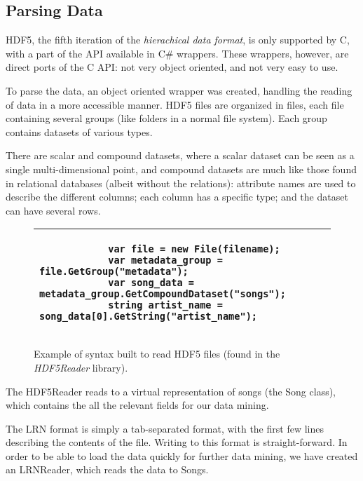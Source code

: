 \subsection{Parsing Data}
\label{sec:preprocessing_parsing}

HDF5, the fifth iteration of the \emph{hierachical data format}, is only supported by C, with a part of the API available
in C\# wrappers. These wrappers, however, are direct ports of the C API: not very object oriented, and not very easy to use.

To parse the data, an object oriented wrapper was created, handling the reading of data in a more accessible manner. HDF5 files
are organized in files, each file containing several groups (like folders in a normal file system). Each group contains
datasets of various types.

There are scalar and compound datasets, where a scalar dataset can be seen as a single multi-dimensional point, and compound
datasets are much like those found in relational databases (albeit without the relations): attribute names are used to describe
the different columns; each column has a specific type; and the dataset can have several rows.

\begin{figure}[h!]
	\begin{tabular}{|p{\textwidth}|}
		\hline
		\begin{verbatim}
			var file = new File(filename);
			var metadata_group = file.GetGroup("metadata");
			var song_data = metadata_group.GetCompoundDataset("songs");
			string artist_name = song_data[0].GetString("artist_name");
		\end{verbatim} \\
		\hline
	\end{tabular}
	\caption{Example of syntax built to read HDF5 files (found in the \emph{HDF5Reader} library).}
\end{figure}

The HDF5Reader reads to a virtual representation of songs (the Song class), which contains the all the relevant fields for our data
mining.

The LRN format is simply a tab-separated format, with the first few lines describing the contents of the file. Writing to this format
is straight-forward. In order to be able to load the data quickly for further data mining, we have created an LRNReader, which reads
the data to Songs.